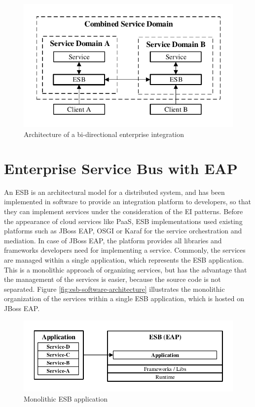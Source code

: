 \begin{figure}[htbp]
	\centering
	\includegraphics[scale=1]{images/esb-bidirectional-integration.pdf}
	\caption{Architecture of a bi-directional enterprise integration}
	\label{fig:esb-bidirectional-integration}
\end{figure} 

\section{Enterprise Service Bus with EAP}
\label{sec:esb-as-software}
An ESB is an architectural model for a distributed system, and has been implemented in software to provide an integration platform to developers, so that they can implement services under the consideration of the EI patterns. Before the appearance of cloud services like PaaS, ESB implementations used existing platforms such as JBoss EAP, OSGI or Karaf for the service orchestration and mediation. In case of JBoss EAP, the platform provides all libraries and frameworks developers need for implementing a service. Commonly, the services are managed within a single application, which represents the ESB application. This is a monolithic approach of organizing services, but has the advantage that the management of the services is easier, because the source code is not separated. Figure \vref{fig:esb-software-architecture} illustrates the monolithic organization of the services within a single ESB application, which is hosted on JBoss EAP.

\begin{figure}[htbp]
	\centering
	\includegraphics[scale=1]{images/esb-software-architecture.pdf}
	\caption{Monolithic ESB application}
	\label{fig:esb-software-architecture}
\end{figure} 
\ \newpage

